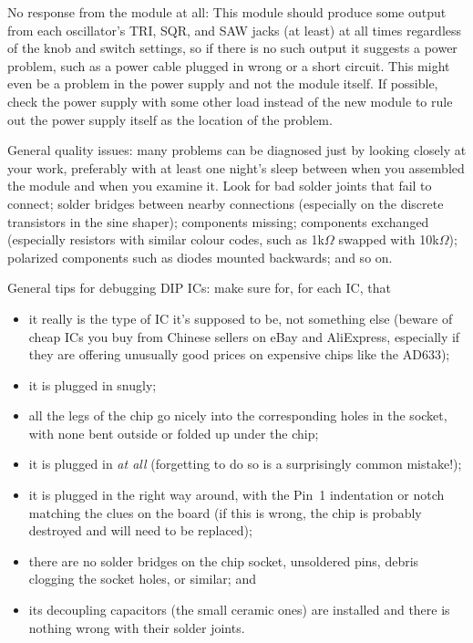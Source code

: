 No response from the module at all:  This module should produce some output
from each oscillator's TRI, SQR, and SAW jacks (at least) at all times
regardless of the knob and switch settings, so if there is no such output it
suggests a power problem, such as a power cable plugged in wrong or a short
circuit.  This might even be a problem in the power supply and not the
module itself.  If possible, check the power supply with some other load
instead of the new module to rule out the power supply itself as the
location of the problem.

General quality issues:  many problems can be diagnosed just by looking
closely at your work, preferably with at least one night's sleep between
when you assembled the module and when you examine it.  Look for bad solder
joints that fail to connect; solder bridges between nearby connections
(especially on the discrete transistors in the sine shaper);
components missing; components exchanged (especially resistors with similar
colour codes, such as 1k$\Omega$ swapped with 10k$\Omega$); polarized
components such as diodes mounted backwards; and so on.

General tips for debugging DIP ICs:  make sure for, for each IC, that
\begin{itemize}
  \item it really is the type of IC it's supposed to be, not something else
    (beware of cheap ICs you buy from Chinese sellers on eBay and
    AliExpress, especially if they are offering unusually good prices on
    expensive chips like the AD633);
  \item it is plugged in snugly;
  \item all the legs of the chip go nicely into the corresponding holes in
    the socket, with none bent outside or folded up under the chip;
  \item it is plugged in \emph{at all} (forgetting to do so is a surprisingly
    common mistake!);
  \item it is plugged in the right way around, with the Pin~1
    indentation or notch matching the clues on the
    board (if this is wrong, the chip is probably destroyed and will need to
    be replaced);
  \item there are no solder bridges on the chip socket, unsoldered pins,
    debris clogging the socket holes, or similar; and
  \item its decoupling capacitors (the small ceramic ones) are installed and
    there is nothing wrong with their solder joints.
\end{itemize}

